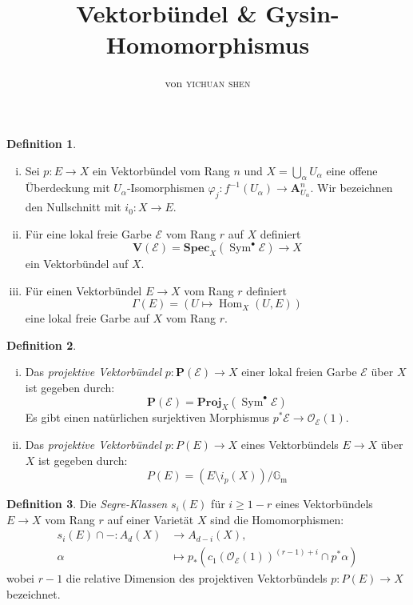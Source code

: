 \documentclass[10pt,a4paper]{article}
\author{von \textsc{yichuan shen}}
\title{Vektorbündel \& Gysin-Homomorphismus}
\begin{document}
\theoremstyle{plain}
\theoremstyle{definition}
\newtheorem{theorem}{Theorem}
\newtheorem{lemma}[theorem]{Lemma}
\newtheorem{proposition}[theorem]{Satz}
\newtheorem{corollary}[theorem]{Korollar}
\theoremstyle{definition}
\newtheorem*{definition}{Definition}
\newtheorem*{example}{Beispiel}
\theoremstyle{remark}
\newtheorem*{remark}{Bemerkung}

\maketitle

\begin{definition}
\begin{enumerate}[(i)]
\item Sei $p: E\to X$ ein Vektorbündel vom Rang $n$ und $X=\bigcup_\alpha U_\alpha$ eine offene Überdeckung mit $U_\alpha$-Isomorphismen $\varphi_j: f^{-1}(U_\alpha)\to \mathbf{A}_{U_\alpha}^n$. Wir bezeichnen den Nullschnitt mit $i_0: X\to E$.
\item Für eine lokal freie Garbe $\mathcal{E}$ vom Rang $r$ auf $X$ definiert
\[ \mathbf{V}(\mathcal{E}) = \mathbf{Spec}_X(\operatorname{Sym}^\bullet\mathcal{E})\to X \]
ein Vektorbündel auf $X$.
\item Für einen Vektorbündel $E\to X$ vom Rang $r$ definiert
\[ \Gamma(E) = (U\mapsto \operatorname{Hom}_X(U, E)) \]
eine lokal freie Garbe auf $X$ vom Rang $r$.
\end{enumerate}
\end{definition}

\begin{definition}
\begin{enumerate}[(i)]
\item Das \textit{projektive Vektorbündel} $p: \mathbf{P}(\mathcal{E})\to X$ einer lokal freien Garbe $\mathcal{E}$ über $X$ ist gegeben durch:
\[ \mathbf{P}(\mathcal{E}) = \mathbf{Proj}_X(\operatorname{Sym}^\bullet\mathcal{E}) \]
Es gibt einen natürlichen surjektiven Morphismus $p^\ast\mathcal{E}\to \mathcal{O}_\mathcal{E}(1)$.
\item Das \textit{projektive Vektorbündel} $p: P(E)\to X$ eines Vektorbündels $E\to X$ über $X$ ist gegeben durch:
\[ P(E) = (E\setminus i_p(X))/\mathbb{G}_\text{m} \]
\end{enumerate}
\end{definition}

\begin{definition}
Die \textit{Segre-Klassen} $s_i(E)$ für $i\geq 1-r$ eines Vektorbündels $E\to X$ vom Rang $r$ auf einer Varietät $X$ sind die Homomorphismen:
\begin{align*}
s_i(E)\cap -: A_d(X)&\to A_{d-i}(X),\\ 
\alpha&\mapsto p_\ast(c_1(\mathcal{O}_\mathcal{E}(1))^{(r-1)+i} \cap p^\ast\alpha)
\end{align*}
wobei $r-1$ die relative Dimension des projektiven Vektorbündels $p: P(E)\to X$ bezeichnet.
\end{definition}
\end{document}
